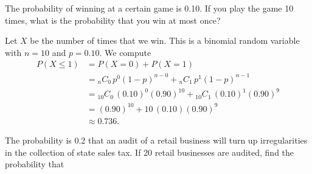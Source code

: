 \documentclass[11pt]{exam}
\renewcommand{\binom}[2]{\ensuremath{{}_{#1}C_{#2}}\,}
\begin{document}
\begin{questions}

\newpage

\question \label{ques:binom-game} The probability of winning at a certain game
is 0.10.  If you play the game 10 times, what is the probability that you win
at most once?


\begin{solution}
Let $X$ be the number of times that we win.  This is a binomial random
variable with $n = 10$ and $p = 0.10$.  We compute
\begin{align*}
  P(X \leq 1)
    &= P(X = 0) + P(X = 1) \\
    &= \binom{n}{0} p^0 (1-p)^{n-0} + \binom{n}{1} p^1 (1 - p)^{n-1} \\
    &= \binom{10}{0} (0.10)^0 (0.90)^{10} + \binom{10}{1} (0.10)^1 (0.90)^9 \\
    &= (0.90)^{10} + 10 \, (0.10) (0.90)^9 \\
    &\approx 0.736.
\end{align*}

\end{solution}


\question The probability is 0.2 that an audit of a retail business will turn up
irregularities in the collection of state sales tax.  If 20 retail businesses
are audited, find the probability that

\begin{parts}




\end{parts}
\end{questions}
\end{document}
